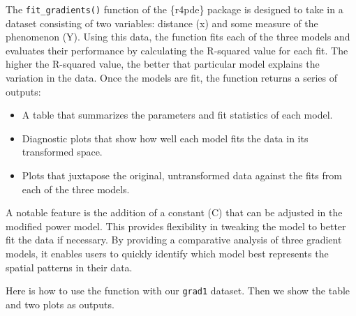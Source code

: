 \documentclass[
  letterpaper,
]{book}
\newenvironment{Shaded}{\begin{snugshade}}{\end{snugshade}}
\newcommand{\AttributeTok}[1]{\textcolor[rgb]{0.40,0.45,0.13}{#1}}
\newcommand{\CommentTok}[1]{\textcolor[rgb]{0.37,0.37,0.37}{#1}}
\newcommand{\DecValTok}[1]{\textcolor[rgb]{0.68,0.00,0.00}{#1}}
\newcommand{\FloatTok}[1]{\textcolor[rgb]{0.68,0.00,0.00}{#1}}
\newcommand{\FunctionTok}[1]{\textcolor[rgb]{0.28,0.35,0.67}{#1}}
\newcommand{\NormalTok}[1]{\textcolor[rgb]{0.00,0.23,0.31}{#1}}
\newcommand{\OtherTok}[1]{\textcolor[rgb]{0.00,0.23,0.31}{#1}}
\newcommand{\SpecialCharTok}[1]{\textcolor[rgb]{0.37,0.37,0.37}{#1}}
\providecommand{\tightlist}{%
  \setlength{\itemsep}{0pt}\setlength{\parskip}{0pt}}\usepackage{longtable,booktabs,array}
\begin{document}
The \texttt{fit\_gradients()} function of the \{r4pde\} package is
designed to take in a dataset consisting of two variables: distance (x)
and some measure of the phenomenon (Y). Using this data, the function
fits each of the three models and evaluates their performance by
calculating the R-squared value for each fit. The higher the R-squared
value, the better that particular model explains the variation in the
data. Once the models are fit, the function returns a series of outputs:

\begin{itemize}
\tightlist
\item
  A table that summarizes the parameters and fit statistics of each
  model.
\item
  Diagnostic plots that show how well each model fits the data in its
  transformed space.
\item
  Plots that juxtapose the original, untransformed data against the fits
  from each of the three models.
\end{itemize}

A notable feature is the addition of a constant (C) that can be adjusted
in the modified power model. This provides flexibility in tweaking the
model to better fit the data if necessary. By providing a comparative
analysis of three gradient models, it enables users to quickly identify
which model best represents the spatial patterns in their data.

Here is how to use the function with our \texttt{grad1} dataset. Then we
show the table and two plots as outputs.

\begin{Shaded}
\end{Shaded}
\end{document}
